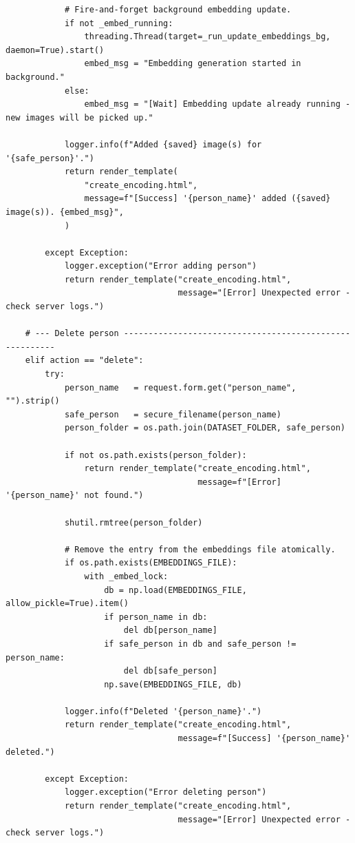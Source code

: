 \documentclass[12pt,a4paper]{report}
\begin{document}
\begin{lstlisting}
            # Fire-and-forget background embedding update.
            if not _embed_running:
                threading.Thread(target=_run_update_embeddings_bg, daemon=True).start()
                embed_msg = "Embedding generation started in background."
            else:
                embed_msg = "[Wait] Embedding update already running - new images will be picked up."

            logger.info(f"Added {saved} image(s) for '{safe_person}'.")
            return render_template(
                "create_encoding.html",
                message=f"[Success] '{person_name}' added ({saved} image(s)). {embed_msg}",
            )

        except Exception:
            logger.exception("Error adding person")
            return render_template("create_encoding.html",
                                   message="[Error] Unexpected error - check server logs.")

    # --- Delete person --------------------------------------------------------
    elif action == "delete":
        try:
            person_name   = request.form.get("person_name", "").strip()
            safe_person   = secure_filename(person_name)
            person_folder = os.path.join(DATASET_FOLDER, safe_person)

            if not os.path.exists(person_folder):
                return render_template("create_encoding.html",
                                       message=f"[Error] '{person_name}' not found.")

            shutil.rmtree(person_folder)

            # Remove the entry from the embeddings file atomically.
            if os.path.exists(EMBEDDINGS_FILE):
                with _embed_lock:
                    db = np.load(EMBEDDINGS_FILE, allow_pickle=True).item()
                    if person_name in db:
                        del db[person_name]
                    if safe_person in db and safe_person != person_name:
                        del db[safe_person]
                    np.save(EMBEDDINGS_FILE, db)

            logger.info(f"Deleted '{person_name}'.")
            return render_template("create_encoding.html",
                                   message=f"[Success] '{person_name}' deleted.")

        except Exception:
            logger.exception("Error deleting person")
            return render_template("create_encoding.html",
                                   message="[Error] Unexpected error - check server logs.")


\end{lstlisting}
\end{document}
